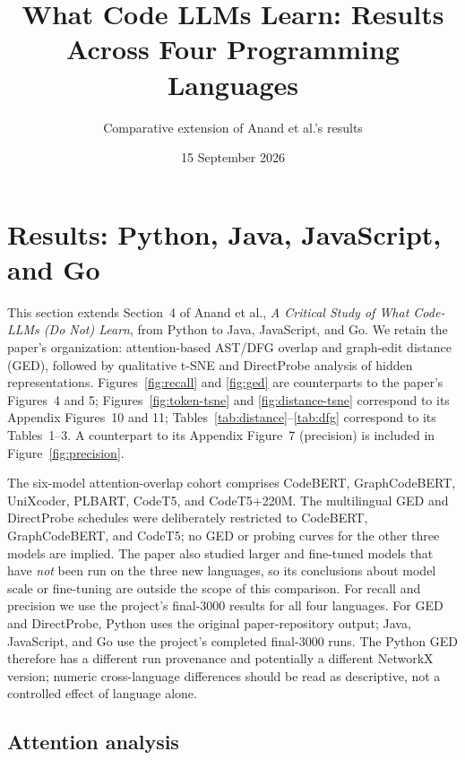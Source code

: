 \documentclass[11pt,a4paper]{article}
\title{What Code LLMs Learn: Results Across Four Programming Languages}
\author{Comparative extension of Anand et al.'s results}
\date{15 September 2026}
\begin{document}
\maketitle

\section{Results: Python, Java, JavaScript, and Go}

This section extends Section~4 of Anand et al., \emph{A Critical Study of What Code-LLMs (Do Not) Learn}, from Python to Java, JavaScript, and Go. We retain the paper's organization: attention-based AST/DFG overlap and graph-edit distance (GED), followed by qualitative t-SNE and DirectProbe analysis of hidden representations. Figures~\ref{fig:recall} and \ref{fig:ged} are counterparts to the paper's Figures~4 and 5; Figures~\ref{fig:token-tsne} and \ref{fig:distance-tsne} correspond to its Appendix Figures~10 and 11; Tables~\ref{tab:distance}--\ref{tab:dfg} correspond to its Tables~1--3. A counterpart to its Appendix Figure~7 (precision) is included in Figure~\ref{fig:precision}.

The six-model attention-overlap cohort comprises CodeBERT, GraphCodeBERT, UniXcoder, PLBART, CodeT5, and CodeT5+220M. The multilingual GED and DirectProbe schedules were deliberately restricted to CodeBERT, GraphCodeBERT, and CodeT5; no GED or probing curves for the other three models are implied. The paper also studied larger and fine-tuned models that have \emph{not} been run on the three new languages, so its conclusions about model scale or fine-tuning are outside the scope of this comparison. For recall and precision we use the project's final-3000 results for all four languages. For GED and DirectProbe, Python uses the original paper-repository output; Java, JavaScript, and Go use the project's completed final-3000 runs. The Python GED therefore has a different run provenance and potentially a different NetworkX version; numeric cross-language differences should be read as descriptive, not a controlled effect of language alone.

\subsection{Attention analysis}
\end{document}
